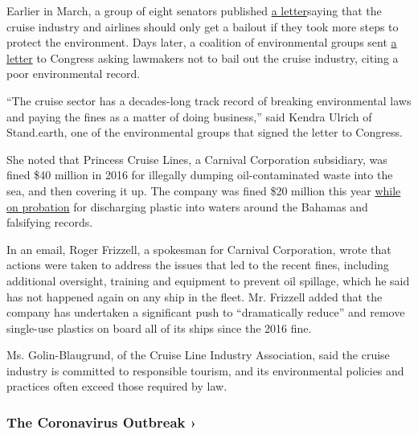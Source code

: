 Earlier in March, a group of eight senators published
\href{https://www.markey.senate.gov/news/press-releases/whitehouse-markey-senate-democrats-request-requirements-for-airlines-and-cruise-lines-to-address-pollution-in-financial-assistance-package}{a
letter}saying that the cruise industry and airlines should only get a
bailout if they took more steps to protect the environment. Days later,
a coalition of environmental groups sent
\href{https://www.stand.earth/sites/stand/files/CongressCruiseBailoutLetter.pdf}{a
letter} to Congress asking lawmakers not to bail out the cruise
industry, citing a poor environmental record.

``The cruise sector has a decades-long track record of breaking
environmental laws and paying the fines as a matter of doing business,''
said Kendra Ulrich of Stand.earth, one of the environmental groups that
signed the letter to Congress.

She noted that Princess Cruise Lines, a Carnival Corporation subsidiary,
was fined \$40 million in 2016 for illegally dumping oil-contaminated
waste into the sea, and then covering it up. The company was fined \$20
million this year
\href{https://www.nytimes3xbfgragh.onion/2019/06/04/business/carnival-cruise-pollution.html}{while
on probation} for discharging plastic into waters around the Bahamas and
falsifying records.

In an email, Roger Frizzell, a spokesman for Carnival Corporation, wrote
that actions were taken to address the issues that led to the recent
fines, including additional oversight, training and equipment to prevent
oil spillage, which he said has not happened again on any ship in the
fleet. Mr. Frizzell added that the company has undertaken a significant
push to ``dramatically reduce'' and remove single-use plastics on board
all of its ships since the 2016 fine.

Ms. Golin-Blaugrund, of the Cruise Line Industry Association, said the
cruise industry is committed to responsible tourism, and its
environmental policies and practices often exceed those required by law.

\href{https://www.nytimes3xbfgragh.onion/news-event/coronavirus?action=click\&pgtype=Article\&state=default\&region=MAIN_CONTENT_3\&context=storylines_faq}{}

\hypertarget{the-coronavirus-outbreak-}{%
\subsubsection{The Coronavirus Outbreak
›}\label{the-coronavirus-outbreak-}}

